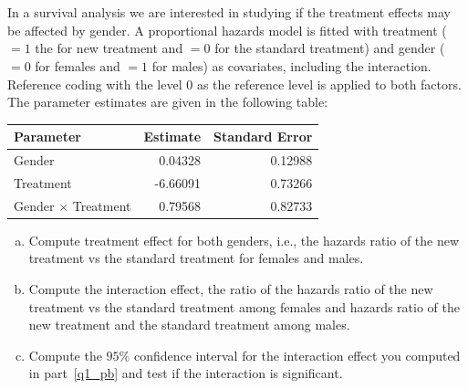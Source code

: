 \documentclass[12pt]{elegantbook}
\begin{document}

\setcounter{chapter}{3}
\chapter{}

    
    \begin{exercise*}[1]
        In a survival analysis we are interested in studying if the treatment effects may be affected by gender. A proportional hazards model is fitted with treatment ($=1$ the for new treatment and $=0$ for the standard treatment) and gender ($=0$ for females and $=1$ for males) as covariates, including the interaction. Reference coding with the level $0$ as the reference level is applied to both factors. The parameter estimates are given in the following table: 
        \begin{table}[H]
            \centering
            \begin{tabular}{lrr}
            \hline
            Parameter                 & Estimate & Standard Error \\ \hline
            Gender                    & 0.04328  & 0.12988        \\
            Treatment                 & -6.66091 & 0.73266        \\
            Gender $\times$ Treatment & 0.79568  & 0.82733        \\ \hline
            \end{tabular}
        \end{table}
        \begin{enumerate}[(a)]
            \item Compute treatment effect for both genders, i.e., the hazards ratio of the new treatment vs the standard treatment for females and males. 
            \item Compute the interaction effect, the ratio of the hazards ratio of the new treatment vs the standard treatment among females and hazards ratio of the new treatment and the standard treatment among males.\label{q1_pb}
            \item Compute the $95\%$ confidence interval for the interaction effect you computed in part~\ref{q1_pb} and test if the interaction is significant. 
        \end{enumerate}
    \end{exercise*}
\end{document}
